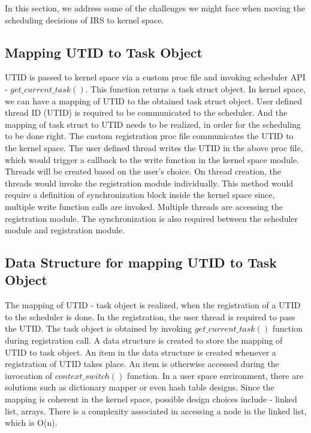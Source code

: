 In this section, we address some of the challenges we might face when moving the scheduling decisions of IRS to kernel space.

\subsection{Mapping UTID to Task Object}

UTID  is passed to kernel space via a custom proc file and invoking scheduler API - $get\_current\_task()$. 
This function returns a task struct object. 
In kernel space, we can have a mapping of UTID to the obtained task struct object. 
User defined thread ID (UTID) is required to be communicated to the scheduler. 
And the mapping of task struct to UTID needs to be realized, in order for the scheduling to be done right. 
The custom registration proc file communicates the UTID to the kernel space. 
The user defined thread writes the UTID in the above proc file, which would trigger a callback to the write function in the kernel space module. 
Threads will be created based on the user's choice. 
On thread creation, the threads would invoke the registration module individually. 
This method would require a definition of synchronization block inside the kernel space since, multiple write function calls are invoked. 
Multiple threads are accessing the registration module. 
The synchronization is also required between the scheduler module and registration module.


\subsection{Data Structure for mapping UTID to Task Object}

The mapping of UTID - task object is realized, when the registration of a UTID to the scheduler is done. 
In the registration, the user thread is required to pass the UTID. 
The task object is obtained by invoking $get\_current\_task()$ function during registration call. 
A data structure is created to store the mapping of UTID to task object. 
An item in the data structure is created whenever a registration of UTID takes place. 
An item is otherwise accessed during the invocation of $context\_switch()$ function. 
In a user space environment, there are solutions such as dictionary mapper or even hash table designs. 
Since the mapping is coherent in the kernel space, possible design choices include - linked list, arrays. 
There is a complexity associated in accessing a node in the linked list, which is O(n).

